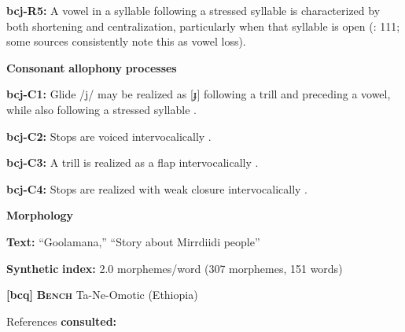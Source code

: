 \documentclass[output=paper]{langsci/langscibook}
\begin{document}
\begin{styleBody}
\textbf{bcj-R5:} A vowel in a syllable following a stressed syllable is characterized by both shortening and centralization, particularly when that syllable is open (\citealt{Bowern2012}: 111; some sources consistently note this as vowel loss).
\end{styleBody}

\begin{styleBody}
\textbf{Consonant} \textbf{allophony} \textbf{processes}
\end{styleBody}

\begin{styleBody}
\textbf{bcj-C1:} Glide /j/ may be realized as [ɟ] following a trill and preceding a vowel, while also following a stressed syllable \citep[80-1]{Bowern2012}.
\end{styleBody}

\begin{styleBody}
\textbf{bcj-C2:}  Stops are voiced intervocalically \citep[76]{Bowern2012}.
\end{styleBody}

\begin{styleBody}
\textbf{bcj-C3:} A trill is realized as a flap intervocalically \citep[81]{Bowern2012}.
\end{styleBody}

\begin{styleBody}
\textbf{bcj-C4:} Stops are realized with weak closure intervocalically \citep[78]{Bowern2012}.
\end{styleBody}

\begin{styleBody}
\textbf{Morphology}
\end{styleBody}

\begin{styleBody}
\textbf{Text:} “Goolamana,” “Story about Mirrdiidi people” \citep[704-710]{Bowern2012}
\end{styleBody}

\begin{styleBody}
\textbf{Synthetic} \textbf{index:} 2.0 morphemes/word (307 morphemes, 151 words)
\end{styleBody}

\begin{styleBody}
\textbf{[bcq]}   \textbf{\textsc{Bench}  }  Ta-Ne-Omotic (Ethiopia)
\end{styleBody}

\begin{styleBody}
References \textbf{consulted:} \citet{Rapold2006}
\end{styleBody}
\end{document}
